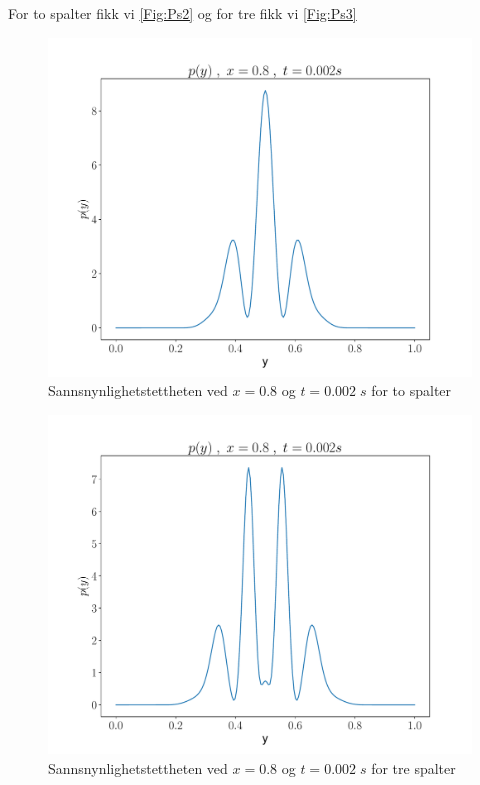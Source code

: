 \documentclass[reprint,english,notitlepage]{revtex4-2}  %
\begin{document}
For to spalter fikk vi \autoref{Fig:Ps2} og for tre fikk vi \autoref{Fig:Ps3}


\begin{figure}[H]
	\centering
	\includegraphics[scale=0.4]{../Images/ScreenProb2Slit.pdf}
	\caption{Sannsnynlighetstettheten ved $x = 0.8$ og $t = 0.002 \; s$ for to spalter}
	\label{Fig:Ps2}
\end{figure}


\begin{figure}[H]
	\centering
	\includegraphics[scale=0.4]{../Images/ScreenProb3Slit.pdf}
	\caption{Sannsnynlighetstettheten ved $x = 0.8$ og $t = 0.002 \; s$ for tre spalter}
	\label{Fig:Ps3}
\end{figure}
\end{document}
